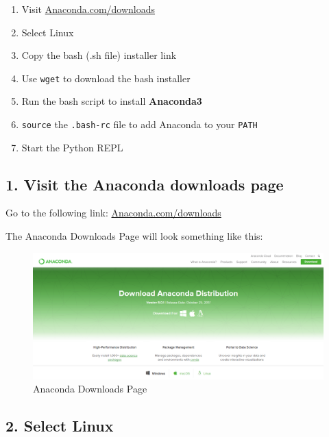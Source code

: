 \documentclass{book}
\makeatletter
\def\maxwidth{\ifdim\Gin@nat@width>\linewidth\linewidth
    \else\Gin@nat@width\fi}
\let\Oldincludegraphics\includegraphics
\renewcommand{\includegraphics}[1]{\Oldincludegraphics[width=.8\maxwidth]{#1}}
\makeatother
\begin{document}
\begin{enumerate}
\def\labelenumi{\arabic{enumi}.}
\item
  Visit
  \href{https://www.anaconda.com/download/}{Anaconda.com/downloads}
\item
  Select Linux
\item
  Copy the bash (.sh file) installer link
\item
  Use \lstinline!wget! to download the bash installer
\item
  Run the bash script to install \textbf{Anaconda3}
\item
  \lstinline!source! the \lstinline!.bash-rc! file to add Anaconda to
  your \lstinline!PATH!
\item
  Start the Python REPL
\end{enumerate}
    




    
        \subsection{1. Visit the Anaconda downloads
page}\label{visit-the-anaconda-downloads-page}

Go to the following link:
\href{https://www.anaconda.com/download/}{Anaconda.com/downloads}

The Anaconda Downloads Page will look something like this:

\begin{figure}
\centering
\includegraphics{images/anaconda_download_page.png}
\caption{Anaconda Downloads Page}
\end{figure}
    




    
        \subsection{2. Select Linux}\label{select-linux}
\end{document}
